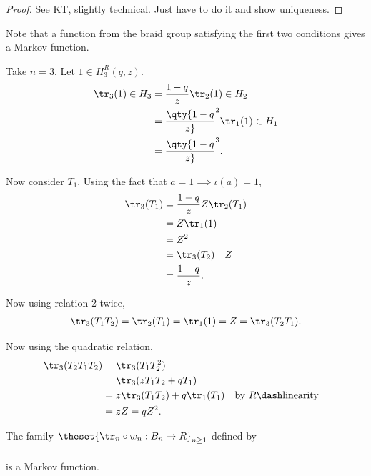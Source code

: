 \begin{proof}

See KT, slightly technical. Just have to do it and show uniqueness.

\end{proof}

\begin{remark}

Note that a function from the braid group satisfying the first two
conditions gives a Markov function.

\end{remark}

\begin{example}

Take \(n=3\). Let \(1\in H_3^R(q, z)\).
\begin{align*}
\tr_3(1) \in H_3 
&= {1 -q \over z} \tr_2(1) \in H_2 \\
&= \qty{1 - q \over z}^2 \tr_1(1) \in H_1 \\
&= \qty{1-q \over z}^3
.\end{align*}

Now consider \(T_1\). Using the fact that \(a=1 \implies \iota(a) = 1\),
\begin{align*}
\tr_3(T_1) 
&= {1-q \over z} Z \tr_2(T_1) \\
&= Z \tr_1(1) \\
&= Z^2 \\
&= \tr_3(T_2) \quad Z  \\
&= {1-q \over z}
.\end{align*}

Now using relation 2 twice,
\begin{align*}
\tr_3(T_1 T_2) = \tr_2(T_1) = \tr_1(1) = Z = \tr_3(T_2 T_1)
.\end{align*}

Now using the quadratic relation,
\begin{align*}
\tr_3(T_2 T_1 T_2) 
&= \tr_3(T_1 T_2^2) \\
&= \tr_3(zT_1 T_2 + qT_1) \\
&= z\tr_3(T_1 T_2) + q\tr_1(T_1) && \text{by } R\dash\text{linearity}\\
&= zZ = qZ^2
.\end{align*}

\end{example}

\begin{theorem}[?]

The family \(\theset{\tr_n \circ w_n: B_n \to R}_{n\geq 1}\) defined by

\begin{center}\end{center}

\begin{align*}
\end{align*} is a Markov function.

\end{theorem}

